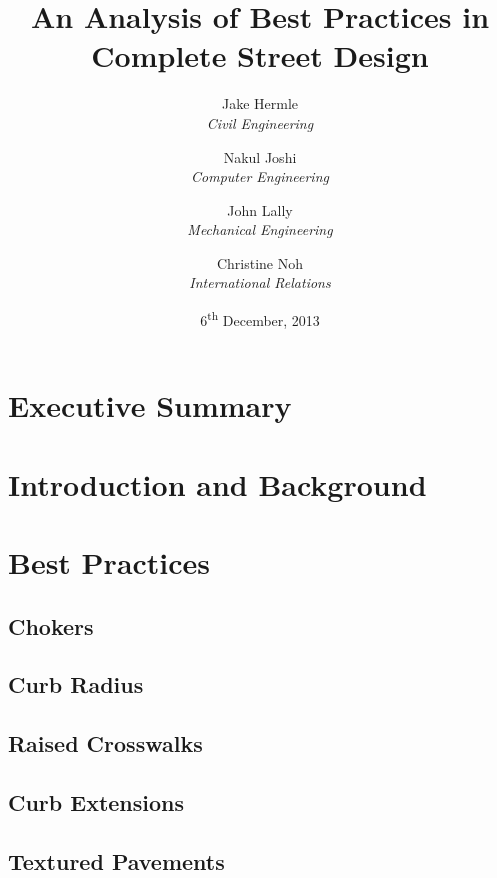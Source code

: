 \documentclass[titlepage,oneside]{article}
\title{An Analysis of Best Practices in Complete Street Design}
\author{
	Jake Hermle\\ \emph{Civil Engineering} \and
	Nakul Joshi\\ \emph{Computer Engineering} \and
	John Lally\\ \emph{Mechanical Engineering}\and
	Christine Noh\\ \emph{International Relations}
}
\date{6\textsuperscript{th} December, 2013}
\begin{document}
\listoftodos



\maketitle

\begin{abstract}

\end{abstract}

\tableofcontents
\newpage
\listoffigures
\newpage
\listoftables
\newpage

\section{Executive Summary}

\clearpage

\section{Introduction and Background}

\clearpage

\section{Best Practices}

	\subsection{Chokers}
	
	\clearpage

	\subsection{Curb Radius}
	
	\clearpage

	\subsection{Raised Crosswalks}
	
	\clearpage

	\subsection{Curb Extensions}
	
	\clearpage
	
	\subsection{Textured Pavements}
	
	\clearpage
	
\end{document}
